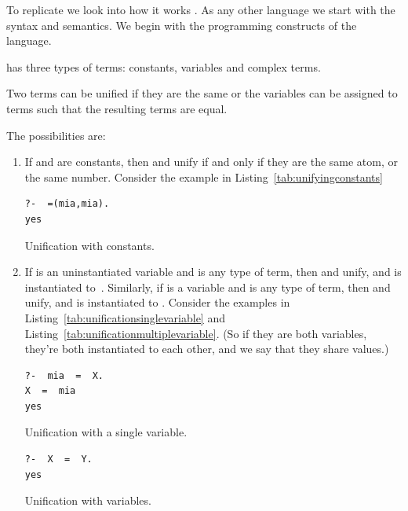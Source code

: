 \documentclass[thesis-solanki.tex]{subfiles}
\begin{document}
To replicate  we look into how it works .
%
As any other language we start with the syntax and semantics.
We begin with the programming constructs of the language.

 has three types of terms: constants, variables and complex terms.

Two terms can be unified if they are the same or the variables can be assigned to terms such that the resulting
terms are equal.

The possibilities are:
\begin{enumerate}
\item If  and  are constants, then  and  unify if and only if they
  are the same atom, or the same number. Consider the example in Listing~\ref{tab:unifyingconstants}
\par
\begin{code-list}[H]
\begin{verbatim}
?-  =(mia,mia).
yes
\end{verbatim}
\caption{Unification with constants.}
\label{tab:unifyingconstants}
\end{code-list}


\item If  is an uninstantiated variable and  is any type of term, then 
  and  unify, and  is instantiated to \,.
  Similarly, if  is a variable and  is any type of term, then  and 
  unify, and  is instantiated to .
  Consider the examples in Listing~\ref{tab:unificationsinglevariable} and 
  Listing~\ref{tab:unificationmultiplevariable}. (So if they are both 
variables, they're both instantiated to each other, and we say that they share values.)
\par
\begin{code-list}[H]
\begin{verbatim}
?-  mia  =  X.
X  =  mia
yes
\end{verbatim}
\caption{Unification with a single variable.}
\label{tab:unificationsinglevariable}
\end{code-list}

\begin{code-list}[H]
\begin{verbatim}
?-  X  =  Y.
yes
\end{verbatim}
\caption{Unification with variables.}
\label{tab:unificationmultiplevariable}
\end{code-list}



\end{enumerate}
\end{document}
